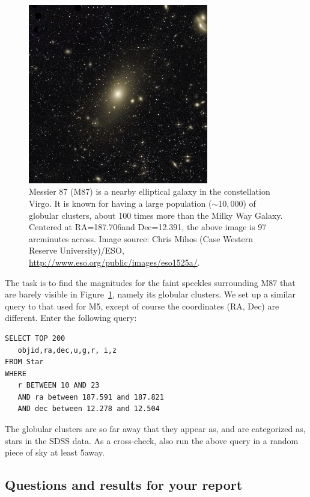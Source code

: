 \begin{figure}
	\centering
	\includegraphics[width=0.7\textwidth]{globular-cluster/eso1525a}
	\caption{Messier 87 (M87) is a nearby elliptical galaxy in the constellation Virgo. It is
		known for having a large population ($\sim 10,000$) of globular clusters, about 100 times more
		than the Milky Way Galaxy. Centered at RA=187.706\textdegree and Dec=12.391\textdegree, the above image
		is 97 arcminutes across. Image source: Chris Mihos (Case Western Reserve University)/ESO, \url{http://www.eso.org/public/images/eso1525a/}.}\label{gc:fig:m87}
\end{figure}

The task is to find the magnitudes for the faint speckles surrounding M87 that are barely visible in
Figure~\ref{gc:fig:m87}, namely its globular clusters. We set up a similar query to that used for M5, except
of course the coordinates (RA, Dec) are different. Enter the following query:

\begin{verbatim}
SELECT TOP 200
   objid,ra,dec,u,g,r, i,z
FROM Star
WHERE
   r BETWEEN 10 AND 23
   AND ra between 187.591 and 187.821
   AND dec between 12.278 and 12.504
\end{verbatim}

The globular clusters are so far away that they appear as, and are categorized as, stars in
the SDSS data. As a cross-check, also run the above query in a random piece of sky at least
5\textdegree away.

\subsection{Questions and results for your report}

